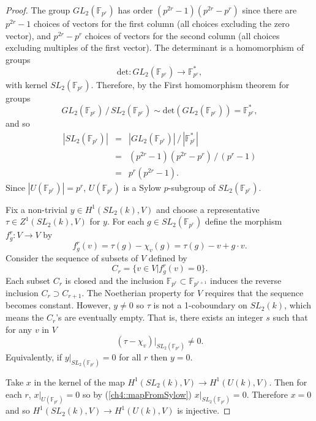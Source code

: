 \begin{proof}
	The group $GL_2(\mathbb{F}_{p^r})$ has order $(p^{2r} - 1)(p^{2r} - p^r)$ since there are $p^{2r} - 1$ choices of vectors for the first column (all choices excluding the zero vector), and $p^{2r} - p^r$ choices of vectors for the second column (all choices excluding multiples of the first vector). The determinant is a homomorphism of groups
	\begin{displaymath}
		\mathrm{det}:GL_2(\mathbb{F}_{p^r}) \rightarrow \mathbb{F}^*_{p^r},
	\end{displaymath}
	with kernel $SL_2(\mathbb{F}_{p^r})$. Therefore, by the First homomorphism theorem for groups
	\begin{displaymath}
		GL_2(\mathbb{F}_{p^r})\,/\,SL_2(\mathbb{F}_{p^r}) \sim \mathrm{det}(GL_2(\mathbb{F}_{p^r})) = \mathbb{F}^*_{p^r},
	\end{displaymath}
	and so
	\begin{eqnarray*}
		|SL_2(\mathbb{F}_{p^r})|
		&=& |GL_2(\mathbb{F}_{p^r})|\,/\,|\mathbb{F}^*_{p^r}|\\
		&=& (p^{2r} - 1)(p^{2r} - p^r)\,/\,(p^r - 1)\\
		&=& p^r(p^{2r} - 1).
	\end{eqnarray*}
	Since $|U(\mathbb{F}_{p^r})| = p^r$, $U(\mathbb{F}_{p^r})$ is a Sylow $p$-subgroup of $SL_2(\mathbb{F}_{p^r})$.
	
	Fix a non-trivial $y\in H^1(SL_2(k), V)$ and choose a representative $\tau\in Z^1(SL_2(k), V)$ for $y$. For each $g\in SL_2(\mathbb{F}_{p^r})$ define the morphism $f^r_g:V\rightarrow V$ by
	\begin{displaymath}
		f^r_g(v) = \tau(g) - \chi_v(g) = \tau(g) - v + g\cdot v.
	\end{displaymath}
	Consider the sequence of subsets of $V$ defined by
	\begin{displaymath}
		C_r = \{v \in V | f^r_g(v) = 0\}.
	\end{displaymath}
	Each subset $C_r$ is closed and the inclusion $\mathbb{F}_{p^r} \subset \mathbb{F}_{p^{r+1}}$ induces the reverse inclusion $C_r \supset C_{r+1}$. The Noetherian property for $V$ requires that the sequence becomes constant. However, $y\neq 0$ so $\tau$ is not a 1-coboundary on $SL_2(k)$, which means the $C_r$'s are eventually empty. That is, there exists an integer $s$ such that for any $v$ in $V$
	\begin{displaymath}
		(\tau - \chi_v)|_{SL_2(\mathbb{F}_{p^s})} \neq 0.
	\end{displaymath}
	Equivalently, if $y|_{SL_2(\mathbb{F}_{p^r})} = 0$ for all $r$ then $y = 0$.
	
	Take $x$ in the kernel of the map $H^1(SL_2(k), V) \rightarrow H^1(U(k), V)$. Then for each $r$, $x|_{U(\mathbb{F}_{p^r})} = 0$ so by (\ref{ch4::mapFromSylow}) $x|_{SL_2(\mathbb{F}_{p^r})} = 0$. Therefore $x=0$ and so $H^1(SL_2(k), V) \rightarrow H^1(U(k), V)$ is injective.
\end{proof}

